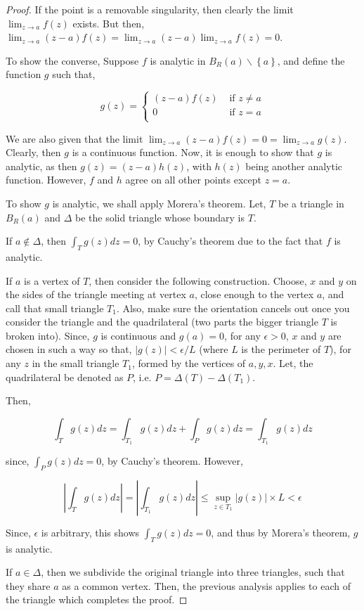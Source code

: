 \documentclass[12pt]{article}
\theoremstyle{definition}
\begin{document}
\begin{proof}
    If the point is a removable singularity, then clearly the limit $\lim_{z \rightarrow a} f(z)$ exists. But then, $\lim_{z \rightarrow a}(z - a) f(z) = \lim_{z\rightarrow a}(z - a) \lim_{z \rightarrow a} f(z) = 0$. 

    To show the converse, Suppose $f$ is analytic in $B_R(a) \backslash \left\{ a \right\}$, and define the function $g$ such that,

    $$
    g(z) = \begin{cases}
        (z - a) f(z) & \text{ if } z \neq a\\
        0 & \text{ if } z = a\\
    \end{cases}
    $$

   We are also given that the limit $\lim_{z \rightarrow a} (z-a)f(z) = 0 = \lim_{z \rightarrow a} g(z)$. Clearly, then $g$ is a continuous function. Now, it is enough to show that $g$ is analytic, as then $g(z) = (z - a)h(z)$, with $h(z)$ being another analytic function. However, $f$ and $h$ agree on all other points except $z = a$.

   To show $g$ is analytic, we shall apply Morera's theorem. Let, $T$ be a triangle in $B_R(a)$ and $\Delta$ be the solid triangle whose boundary is $T$. 

   If $a \notin \Delta$, then $\int_T g(z)dz = 0$, by Cauchy's theorem due to the fact that $f$ is analytic.

   If $a$ is a vertex of $T$, then consider the following construction. Choose, $x$ and $y$ on the sides of the triangle meeting at vertex $a$, close enough to the vertex $a$, and call that small triangle $T_1$. Also, make sure the orientation cancels out once you consider the triangle and the quadrilateral (two parts the bigger triangle $T$ is broken into). Since, $g$ is continuous and $g(a) = 0$, for any $\epsilon > 0$, $x$ and $y$ are chosen in such a way so that, $\vert g(z) \vert < \epsilon / L$ (where $L$ is the perimeter of $T$), for any $z$ in the small triangle $T_1$, formed by the vertices of $a, y, x$. Let, the quadrilateral be denoted as $P$, i.e. $P = \Delta(T) - \Delta(T_1)$. 

   Then, 

   $$\int_T g(z)dz = \int_{T_1} g(z)dz + \int_P g(z)dz = \int_{T_1} g(z)dz$$

   since, $\int_P g(z)dz = 0$, by Cauchy's theorem. However, 
   
   $$\left\vert \int_T g(z)dz \right\vert = \left\vert \int_{T_1} g(z)dz \right\vert \leq \sup_{z \in T_1} \vert g(z) \vert \times L < \epsilon$$

   Since, $\epsilon$ is arbitrary, this shows $\int_T g(z)dz = 0$, and thus by Morera's theorem, $g$ is analytic.

   If $a \in \Delta$, then we subdivide the original triangle into three triangles, such that they share $a$ as a common vertex. Then, the previous analysis applies to each of the triangle which completes the proof. 
\end{proof}
\end{document}
